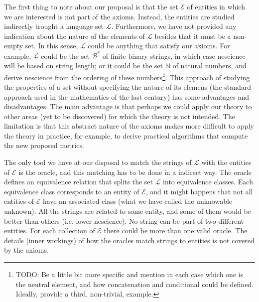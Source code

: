 The first thing to note about our proposal is that the set $\mathcal{E}$ of entities in which we are interested is not part of the axioms. Instead, the entities are studied indirectly trought a language set $\mathcal{L}$. Furthermore, we have not provided any indication about the nature of the elements of $\mathcal{L}$ besides that it must be a non-empty set. In this sense, $\mathcal{L}$ could be anything that satisfy our axioms. For example, $\mathcal{L}$ could be the set $\mathcal{B}^\ast$ of finite binary strings, in which case nescience will be based on string length; or it could be the set $\mathbb{N}$ of natural numbers, and derive nescience from the ordering of these numbers\footnote{\color{red} TODO: Be a little bit more specific and mention in each case which one is the neutral element, and how concatenation and conditional could be defined. Ideally, provide a third, non-trivial, example.}. This approach of studying the properties of a set without specifying the nature of its elemens (the standard approach used in the mathematics of the last century) has some advantages and disadvantages. The main advantage is that perhaps we could apply our theory to other areas (yet to be discovered) for which the theory is not intended. The limitation is that this abstract nature of the axioms makes more difficult to apply the theory in practice, for example, to derive practical algorithms that compute the new proposed metrics.

The only tool we have at our disposal to match the strings of $\mathcal{L}$ with the entities of $\mathcal{E}$ is the oracle, and this matching has to be done in a indirect way. The oracle defines an equivalence relation that splits the set $\mathcal{L}$ into equivalence classes. Each equivalence class corresponds to an entity of $\mathcal{E}$, and it might happens that not all entities of $\mathcal{E}$ have an associated class (what we have called the unknowable unknown). All the strings are related to some entity, and some of them would be better than others (i.e. lower nescience). No string can be part of two different entities. For each collection of $\mathcal{E}$ there could be more than one valid oracle. The details (inner workings) of how the oracles match strings to entities is not covered by the axioms.

